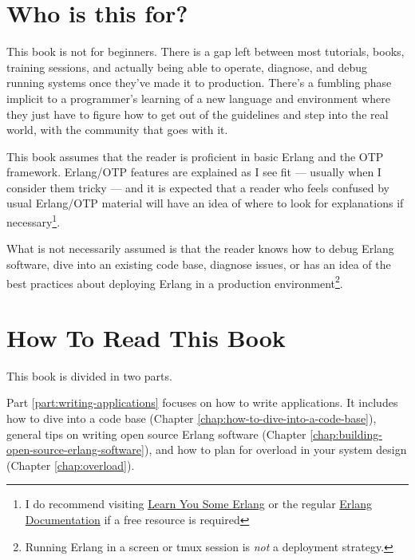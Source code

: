 \section*{Who is this for?}
\label{sec:who-is-this-for}

This book is not for beginners. There is a gap left between most tutorials, books, training sessions, and actually being able to operate, diagnose, and debug running systems once they've made it to production. There's a fumbling phase implicit to a programmer's learning of a new language and environment where they just have to figure how to get out of the guidelines and step into the real world, with the community that goes with it.

This book assumes that the reader is proficient in basic Erlang and the OTP framework. Erlang/OTP features are explained as I see fit — usually when I consider them tricky — and it is expected that a reader who feels confused by usual Erlang/OTP material will have an idea of where to look for explanations if necessary\footnote{I do recommend visiting \href{http://learnyousomeerlang.com}{Learn You Some Erlang} or the regular \href{http://www.erlang.org/erldoc}{Erlang Documentation} if a free resource is required}.

What is not necessarily assumed is that the reader knows how to debug Erlang software, dive into an existing code base, diagnose issues, or has an idea of the best practices about deploying Erlang in a production environment\footnote{Running Erlang in a screen or tmux session is \emph{not} a deployment strategy.}.

\section*{How To Read This Book}
\label{sec:how-to-read-this-book}

This book is divided in two parts. 

Part \ref{part:writing-applications} focuses on how to write applications. It includes how to dive into a code base (Chapter \ref{chap:how-to-dive-into-a-code-base}), general tips on writing open source Erlang software (Chapter \ref{chap:building-open-source-erlang-software}), and how to plan for overload in your system design (Chapter \ref{chap:overload}).

